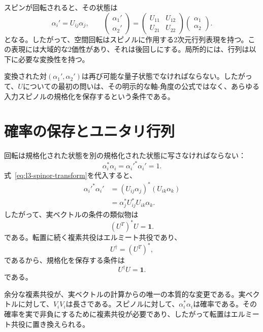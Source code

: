 スピンが回転されると、その状態は
\begin{equation}
\alpha_i'=U_{ij}\alpha_j,
\qquad
\begin{pmatrix}\alpha_1'\\\alpha_2'\end{pmatrix}
=
\begin{pmatrix}
U_{11}&U_{12}\\
U_{21}&U_{22}
\end{pmatrix}
\begin{pmatrix}\alpha_1\\\alpha_2\end{pmatrix}.
\label{eq:l3-spinor-transform}
\end{equation}
となる。したがって、空間回転はスピノルに作用する2次元行列表現を持つ。この表現には大域的な2価性があり、それは後回しにする。局所的には、行列は以下に必要な変換性を持つ。

変換された対\((\alpha_1',\alpha_2')\)は再び可能な量子状態でなければならない。したがって、\(U\)についての最初の問いは、その明示的な軸-角度の公式ではなく、あらゆる入力スピノルの規格化を保存するという条件である。

\section{確率の保存とユニタリ行列}

回転は規格化された状態を別の規格化された状態に写さなければならない：
\begin{equation}
\alpha_i^*\alpha_i=\alpha_i'^*\alpha_i'=1.
\end{equation}
式~\eqref{eq:l3-spinor-transform}を代入すると、
\begin{align}
\alpha_i'^*\alpha_i'
 &=(U_{ij}\alpha_j)^*(U_{ik}\alpha_k)\\
 &=\alpha_j^*U_{ij}^*U_{ik}\alpha_k.
\end{align}
したがって、実ベクトルの条件の類似物は
\begin{equation}
(U^T)^*U=\boldsymbol 1.
\end{equation}
である。転置に続く複素共役はエルミート共役であり、
\begin{equation}
U^\dagger=(U^T)^*,
\end{equation}
であるから、規格化を保存する条件は
\begin{equation}
U^\dagger U=\boldsymbol 1.
\label{eq:l3-unitarity}
\end{equation}
である。

余分な複素共役が、実ベクトルの計算からの唯一の本質的な変更である。実ベクトルに対して、\(V_iV_i\)は長さである。スピノルに対して、\(\alpha_i^*\alpha_i\)は確率である。その確率を実で非負にするために複素共役が必要であり、したがって転置はエルミート共役に置き換えられる。

